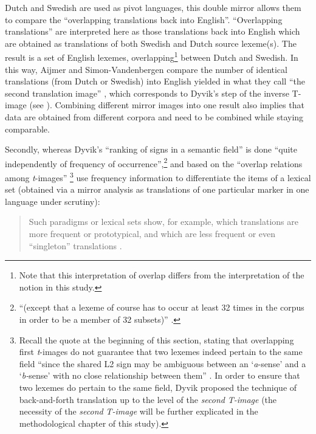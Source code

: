 Dutch and Swedish are used as pivot languages, this double mirror allows them to compare the “overlapping translations back into English”. “Overlapping translations” are interpreted here as those translations back into English which are obtained as translations of both Swedish and Dutch source lexeme(s). The result is a set of English lexemes, overlapping\footnote{Note that this interpretation of overlap differs from the interpretation of the notion in this study.} between Dutch and Swedish. In this way, Aijmer and Simon-Vandenbergen compare  the number of identical translations (from Dutch or Swedish) into English yielded in what they call “the second translation image” \citep[1796]{aijmer_model_2004}, which corresponds to Dyvik’s step of the inverse T-image (see ). Combining different mirror images into one result also implies that data are obtained from different corpora and need to be combined while staying comparable.

Secondly, whereas Dyvik’s “ranking of signs in a semantic field” is done “quite independently of frequency of occurrence”,\footnote{“(except that a lexeme of course has to occur at least 32 times in the corpus in order to be a member of 32 subsets)” \citep[73]{johansson_translational_1998}.} and based on the “overlap relations among \textit{t}{}-images” \citep[73]{johansson_translational_1998}\footnote{Recall the quote at the beginning of this section, stating that overlapping first \textit{t}{}-images do not guarantee that two lexemes indeed pertain to the same field “since the shared L2 sign may be ambiguous between an ‘\textit{a}{}-sense’ and a ‘\textit{b-}sense’ with no close relationship between them” \citep[72]{johansson_translational_1998}. In order to ensure that two lexemes do pertain to the same field, Dyvik proposed the technique of back-and-forth translation up to the level of the \textit{second} \textit{T-image} (the necessity of the \textit{second} \textit{T-image} will be further explicated in the methodological chapter of this study).} \citet{aijmer_model_2004} use frequency information to differentiate the items of a lexical set (obtained via a mirror analysis as translations of one particular marker in one language under scrutiny): 

\begin{quote}
Such paradigms or lexical sets show, for example, which translations are more frequent or prototypical, and which are less frequent or even ``singleton'' translations \citep[1785--1786]{aijmer_model_2004}.
\end{quote}

